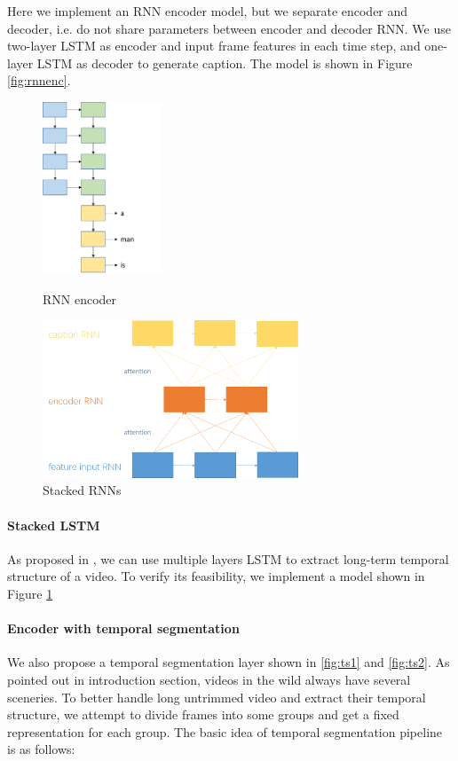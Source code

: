 Here we implement an RNN encoder model, but we separate encoder and decoder, i.e. do not share parameters between encoder and decoder RNN. We use two-layer LSTM as encoder and input frame features in each time step, and one-layer LSTM as decoder to generate caption. The model is shown in Figure \ref{fig:rnnenc}.

\begin{figure}[htbp]
\begin{minipage}[t]{0.5\linewidth}
\centering
\includegraphics[width=1.4in]{resources/rnnenc.png}
\caption{RNN encoder}
\label{fig:rnnenc}
\end{minipage}
\begin{minipage}[t]{0.5\linewidth}
\centering
\includegraphics[width=3in]{resources/stack.png}
\caption{Stacked RNNs}
\label{fig:stack}
\end{minipage}
\end{figure}

\paragraph{Stacked LSTM}
As proposed in \cite{pan2015hierarchical}, we can use multiple layers LSTM to extract long-term temporal structure of a video. To verify its feasibility, we implement a model shown in Figure \ref{fig:stack}

\paragraph{Encoder with temporal segmentation}
We also propose a temporal segmentation layer shown in \autoref{fig:ts1} and \autoref{fig:ts2}. As pointed out in introduction section, videos in the wild always have several sceneries. To better handle long untrimmed video and extract their temporal structure, we attempt to divide frames into some groups and get a fixed representation for each group. The basic idea of temporal segmentation pipeline is as follows:

